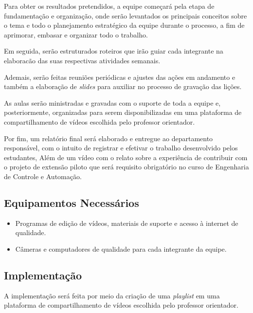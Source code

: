\documentclass[a4paper,10pt]{article} %
\begin{document}
Para obter os resultados pretendidos, a equipe começará pela etapa de fundamentação e organização, onde serão levantados os principais conceitos sobre o tema e todo o planejamento estratégico da equipe durante o processo, a fim de aprimorar, embasar e organizar todo o trabalho.

Em seguida, serão estruturados roteiros que irão guiar cada integrante na elaboracão das suas respectivas atividades semanais.

Ademais, serão feitas reuniões periódicas e ajustes das ações em andamento e também a elaboração de \textit{slides} para auxiliar no processo de gravação das lições.

As aulas serão ministradas e gravadas com o suporte de toda a equipe e, posteriormente, organizadas para serem disponibilizadas em uma plataforma de compartilhamento de vídeos escolhida  pelo  professor orientador.

Por fim, um relatório final será elaborado e entregue ao departamento responsável, com o intuito de registrar e efetivar o trabalho desenvolvido pelos estudantes, Além de um vídeo com o relato sobre a experiência de contribuir com  o projeto de extensão piloto que será requisito obrigatório no curso de Engenharia de Controle e Automação.
 
\subsection{Equipamentos Necessários}

\begin{itemize}
 \item Programas de edição de vídeos, materiais de suporte e acesso à internet de qualidade. 
 \item Câmeras e computadores de qualidade para cada integrante da equipe.
 \end{itemize}

\subsection{Implementação}
A implementação será feita por meio da criação de uma \textit{playlist} em uma plataforma de compartilhamento de vídeos escolhida pelo professor orientador.

\end{document}
